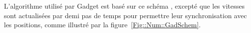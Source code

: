 			L'algorithme utilisé par Gadget est basé sur ce schéma \sm, excepté que les vitesses sont actualisées par demi pas de temps
			pour permettre leur synchronisation avec les positions, comme illustré par la figure~\ref{Fig::Num::GadSchem}.
			\begin{figure}[htpb]




				\centering {}
\end{figure}
